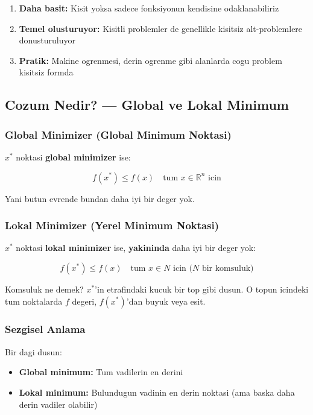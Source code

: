 \documentclass[12pt,a4paper]{article}
\theoremstyle{definition}
\theoremstyle{remark}
\begin{document}
\begin{enumerate}[leftmargin=*, itemsep=0.3em]
\item \textbf{Daha basit:} Kisit yoksa sadece fonksiyonun kendisine odaklanabiliriz
\item \textbf{Temel olusturuyor:} Kisitli problemler de genellikle kisitsiz alt-problemlere donusturuluyor
\item \textbf{Pratik:} Makine ogrenmesi, derin ogrenme gibi alanlarda cogu problem kisitsiz formda
\end{enumerate}

\subsection{Cozum Nedir? --- Global ve Lokal Minimum}

\subsubsection{Global Minimizer (Global Minimum Noktasi)}

$x^*$ noktasi \textbf{global minimizer} ise:

\[
f(x^*) \leq f(x) \quad \text{tum } x \in \mathbb{R}^n \text{ icin}
\]

Yani butun evrende bundan daha iyi bir deger yok.

\subsubsection{Lokal Minimizer (Yerel Minimum Noktasi)}

$x^*$ noktasi \textbf{lokal minimizer} ise, \textbf{yakininda} daha iyi bir deger yok:

\[
f(x^*) \leq f(x) \quad \text{tum } x \in N \text{ icin ($N$ bir komsuluk)}
\]

Komsuluk ne demek? $x^*$'in etrafindaki kucuk bir top gibi dusun. O topun icindeki tum noktalarda $f$ degeri, $f(x^*)$'dan buyuk veya esit.

\subsubsection{Sezgisel Anlama}

Bir dagi dusun:
\begin{itemize}[leftmargin=*, itemsep=0.2em]
\item \textbf{Global minimum:} Tum vadilerin en derini
\item \textbf{Lokal minimum:} Bulundugun vadinin en derin noktasi (ama baska daha derin vadiler olabilir)
\end{itemize}
\end{document}
